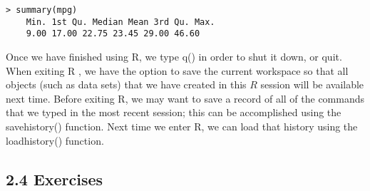 \documentclass[10pt]{article}
\begin{document}
\begin{verbatim}
> summary(mpg)
    Min. 1st Qu. Median Mean 3rd Qu. Max.
    9.00 17.00 22.75 23.45 29.00 46.60
\end{verbatim}

Once we have finished using R, we type q() in order to shut it down, or quit. When exiting R , we have the option to save the current workspace so that all objects (such as data sets) that we have created in this $R$ session will be available next time. Before exiting R, we may want to save a record of all of the commands that we typed in the most recent session; this can be accomplished using the savehistory() function. Next time we enter R, we can load that history using the loadhistory() function.

\subsection*{2.4 Exercises}
\end{document}
